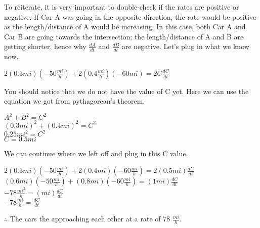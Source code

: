 \documentclass[12pt,fleqn]{book} %
\begin{document}
\noindent To reiterate, it is very important to double-check if the rates are positive or negative. If Car A was going in the opposite direction, the rate would be
positive as the length/distance of A would be increasing. In this case, both Car A and Car B are going towards the intersection; the length/distance of A and B are
getting shorter, hence why $\frac{dA}{dt}$ and $\frac{dB}{dt}$ are negative. Let's plug in what we know now.

\begin{center}
    $2(0.3mi)(-50\frac{mi}{h})+2(0.4\frac{mi}{h})(-60mi)=2C\frac{dC}{dt}$ \\
\end{center}

\noindent You should notice that we do not have the value of C yet. Here we can use the equation we got from pythagorean's theorem.

\begin{center}
    $A^2+B^2=C^2$ \\
    \vspace*{1mm}
    $(0.3mi)^2+(0.4mi)^2=C^2$ \\
    \vspace*{1mm}
    $0.25mi^2=C^2$ \\
    \vspace*{1mm}
    $C=0.5mi$
\end{center}

\noindent We can continue where we left off and plug in this C value.

\begin{center}
    $2(0.3mi)(-50\frac{mi}{h})+2(0.4mi)(-60\frac{mi}{h})=2(0.5mi)\frac{dC}{dt}$ \\
    \vspace*{1mm}
    $(0.6mi)(-50\frac{mi}{h})+(0.8mi)(-60\frac{mi}{h})=(1mi)\frac{dC}{dt}$ \\
    \vspace*{1mm}
    $-78\frac{mi^2}{h}=(mi)\frac{dC}{dt}$ \\
    \vspace*{1mm}
    $-78\frac{mi}{h}=\frac{dC}{dt}$
\end{center}

\noindent $\therefore$ The cars the approaching each other at a rate of 78 $\frac{mi}{h}$.

\pagebreak


\end{document}
